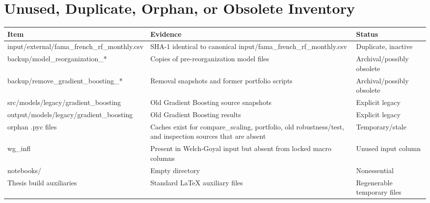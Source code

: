 \documentclass[
  11pt,
  a4paper]{article}
\newcounter{none} %
\begin{document}
\section{Unused, Duplicate, Orphan, or Obsolete
Inventory}\label{app-obsolete}

{\def\LTcaptype{none} %
\begin{longtable}[]{@{}
  >{\raggedright\arraybackslash}p{}
  >{\raggedright\arraybackslash}p{}
  >{\raggedright\arraybackslash}p{}@{}}
\toprule\noalign{}
\begin{minipage}[b]{\linewidth}\raggedright
Item
\end{minipage} & \begin{minipage}[b]{\linewidth}\raggedright
Evidence
\end{minipage} & \begin{minipage}[b]{\linewidth}\raggedright
Status
\end{minipage} \\
\midrule\noalign{}
\endhead
\bottomrule\noalign{}
\endlastfoot
input/external/fama\_\allowbreak{}french\_\allowbreak{}rf\_\allowbreak{}monthly.csv & SHA-1 identical to
canonical input/fama\_\allowbreak{}french\_\allowbreak{}rf\_\allowbreak{}monthly.csv & Duplicate, inactive \\
backup/model\_\allowbreak{}reorganization\_\allowbreak{}* & Copies of pre-reorganization model
files & Archival/possibly obsolete \\
backup/remove\_\allowbreak{}gradient\_\allowbreak{}boosting\_\allowbreak{}* & Removal snapshots and former
portfolio scripts & Archival/possibly obsolete \\
src/models/legacy/gradient\_\allowbreak{}boosting & Old Gradient Boosting source
snapshots & Explicit legacy \\
output/models/legacy/gradient\_\allowbreak{}boosting & Old Gradient Boosting results
& Explicit legacy \\
orphan .pyc files & Caches exist for compare\_\allowbreak{}scaling, portfolio, old
robustness/test, and inspection sources that are absent &
Temporary/stale \\
wg\_\allowbreak{}infl & Present in Welch-Goyal input but absent from locked macro
columns & Unused input column \\
notebooks/ & Empty directory & Nonessential \\
Thesis build auxiliaries & Standard LaTeX auxiliary files & Regenerable
temporary files \\
\end{longtable}
}
\end{document}
